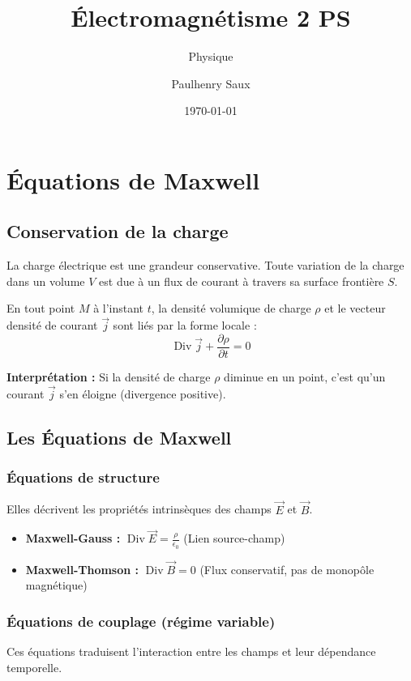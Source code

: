 \documentclass[french]{yLectureNote}
\title{Électromagnétisme 2 PS}
\subtitle{Physique}
\author{Paulhenry Saux}
\date{\today}
\renewcommand{\vec}{\overrightarrow}
\DeclareMathOperator{\Div}{Div}
\begin{document}
\setcounter{chapter}{2}
\chapter{Équations de Maxwell}

\section{Conservation de la charge}

La charge électrique est une grandeur conservative. Toute variation de la charge dans un volume $V$ est due à un flux de courant à travers sa surface frontière $S$.

\begin{theorem}
    En tout point $M$ à l'instant $t$, la densité volumique de charge $\rho$ et le vecteur densité de courant $\vec{j}$ sont liés par la forme locale :
    $$\Div \vec{j} + \frac{\partial \rho}{\partial t} = 0$$
\end{theorem}

\textbf{Interprétation :} Si la densité de charge $\rho$ diminue en un point, c'est qu'un courant $\vec{j}$ s'en éloigne (divergence positive).

\section{Les Équations de Maxwell}

\subsection{Équations de structure}
Elles décrivent les propriétés intrinsèques des champs $\vec{E}$ et $\vec{B}$.

\begin{definition}
    \begin{itemize}
        \item \textbf{Maxwell-Gauss :} $\Div \vec{E} = \frac{\rho}{\epsilon_0}$ (Lien source-champ)
        \item \textbf{Maxwell-Thomson :} $\Div \vec{B} = 0$ (Flux conservatif, pas de monopôle magnétique)
    \end{itemize}
\end{definition}

\subsection{Équations de couplage (régime variable)}
Ces équations traduisent l'interaction entre les champs et leur dépendance temporelle.
\end{document}
